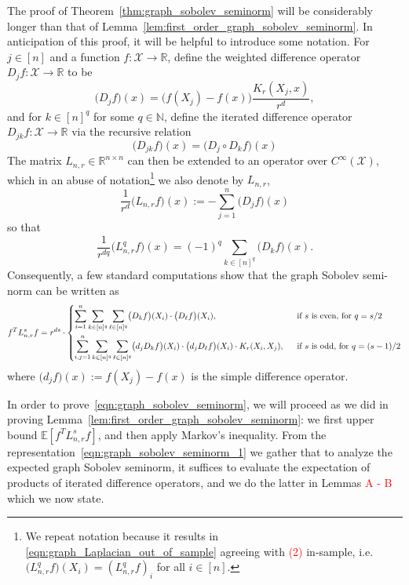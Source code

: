 \documentclass{article}
\newcommand{\Reals}{\mathbb{R}}
\newcommand{\1}{\mathbf{1}}
\newcommand{\Lap}{L}
\newcommand{\Xset}{\mathcal{X}}
\newcommand{\Ebb}{\mathbb{E}}
\theoremstyle{alden}
\theoremstyle{aldenthm}
\theoremstyle{definition}
\theoremstyle{remark}
\begin{document}
The proof of Theorem~\ref{thm:graph_sobolev_seminorm} will be considerably longer than that of Lemma~\ref{lem:first_order_graph_sobolev_seminorm}. In anticipation of this proof, it will be helpful to introduce some notation. For $j \in [n]$ and a function $f: \Xset \to \Reals$, define the weighted difference operator $D_jf: \Xset \to \Reals$ to be
\begin{equation*}
\bigl(D_jf\bigr)(x) = \bigl(f(X_j) - f(x)\bigr) \frac{K_r(X_j,x)}{r^d},
\end{equation*}
and for $k \in [n]^q$ for some $q \in \mathbb{N}$, define the iterated difference operator $D_{jk}f: \Xset \to \Reals$ via the recursive relation
\begin{equation*}
\bigl(D_{jk}f\bigr)(x) = \bigl(D_j \circ D_kf\bigr)(x)
\end{equation*}
The matrix $\Lap_{n,r} \in \Reals^{n \times n}$ can then be extended to an operator over $C^{\infty}(\Xset)$, which in an abuse of notation\footnote{We repeat notation because it results in \eqref{eqn:graph_Laplacian_out_of_sample} agreeing with \textcolor{red}{(2)} in-sample, i.e. $\bigl(\Lap_{n,r}^qf\bigr)(X_i) = (\Lap_{n,r}^qf)_i$ for all $i \in [n]$.} we also denote by $\Lap_{n,r}$,
\begin{equation*}
\frac{1}{r^d}\bigl(\Lap_{n,r}f\bigr)(x) := -\sum_{j = 1}^{n} \bigl(D_jf\bigr)(x)
\end{equation*}
so that
\begin{equation}
\label{eqn:graph_Laplacian_out_of_sample}
\frac{1}{r^{dq}}\bigl(\Lap_{n,r}^qf\bigr)(x) = (-1)^q \sum_{k \in [n]^q} \bigl(D_kf\bigr)(x).
\end{equation} 
Consequently, a few standard computations show that the graph Sobolev semi-norm can be written as 
\begin{equation}
\label{eqn:graph_sobolev_seminorm_1}
f^T \Lap_{n,r}^s f = r^{ds} \cdot
\begin{dcases}
\sum_{i = 1}^{n} \sum_{k \in [n]^q} \sum_{\ell \in [n]^q} \bigl(D_kf\bigr)(X_i) \cdot \bigl(D_\ell f\bigr)(X_i),~~ & \textrm{if $s$ is even, for $q = s/2$} \\
\sum_{i,j = 1}^{n} \sum_{k \in [n]^q} \sum_{\ell \in [n]^q} \bigl(d_jD_kf\bigr)(X_i) \cdot \bigl(d_jD_{\ell}f\bigr)(X_i) \cdot K_r(X_i,X_j),~~ & \textrm{if $s$ is odd, for $q = (s - 1)/2$}
\end{dcases}
\end{equation}
where $\bigl(d_jf\bigr)(x) := f(X_j) - f(x)$ is the simple difference operator. 

In order to prove~\eqref{eqn:graph_sobolev_seminorm}, we will proceed as we did in proving Lemma~\ref{lem:first_order_graph_sobolev_seminorm}: we first upper bound $\Ebb[f^T \Lap_{n,r}^s f]$, and then apply Markov's inequality. From the representation~\eqref{eqn:graph_sobolev_seminorm_1} we gather that to analyze the expected graph Sobolev seminorm, it suffices to evaluate the expectation of products of iterated difference operators, and we do the latter in Lemmas \textcolor{red}{A - B} which we now state.
\end{document}
